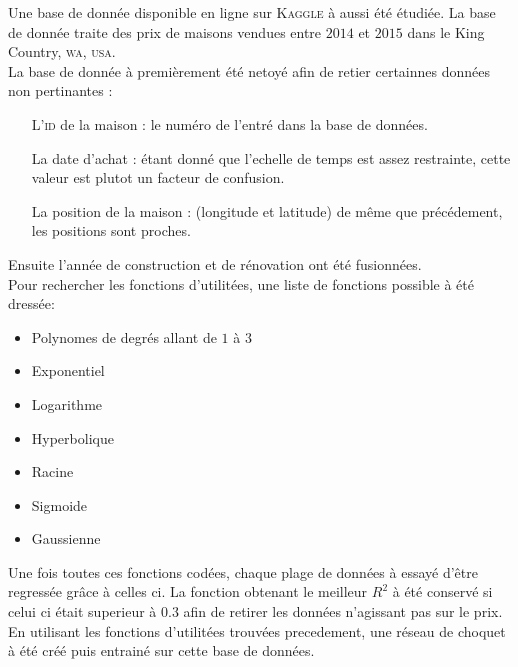 Une base de donnée disponible en ligne sur \textsc{Kaggle} à aussi été étudiée\cite{kaggle}.
La base de donnée traite des prix de maisons vendues entre $2014$ et $2015$
dans le King Country, \textsc{wa}, \textsc{usa}.\\
La base de donnée à premièrement été netoyé afin de retier certainnes données non pertinantes :
\begin{itemize}
    \item[L'\textsc{id} de la maison :] le numéro de l'entré dans la base de données.
    \item[La date d'achat :] étant donné que l'echelle de temps est assez restrainte, cette valeur est plutot un facteur de confusion.
    \item[La position de la maison :] (longitude et latitude) de même que précédement, les positions sont proches.
\end{itemize}
Ensuite l'année de construction et de rénovation ont été fusionnées.\\


Pour rechercher les fonctions d'utilitées, une liste de fonctions possible à été dressée:
\begin{itemize}
    \item Polynomes de degrés allant de $1$ à $3$
    \item Exponentiel
    \item Logarithme
    \item Hyperbolique
    \item Racine
    \item Sigmoide
    \item Gaussienne
\end{itemize}
Une fois toutes ces fonctions codées, chaque plage de données à essayé d'être regressée grâce à celles ci.
La fonction obtenant le meilleur $R^2$ à été conservé si celui ci était superieur à $0.3$ afin de retirer
les données n'agissant pas sur le prix.\\


En utilisant les fonctions d'utilitées trouvées precedement, une réseau de choquet à été créé puis entrainé
sur cette base de données.
